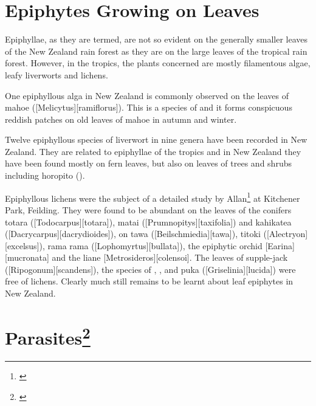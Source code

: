 \section{Epiphytes Growing on Leaves}

Epiphyllae, as they are termed, are not so evident on the generally smaller leaves of the New Zealand rain forest as they are on the large leaves of the tropical rain forest.
However, in the tropics, the plants concerned are mostly filamentous algae, leafy liverworts and lichens.

One epiphyllous alga in New Zealand is commonly observed on the leaves of mahoe ([Melicytus][ramiflorus]).
This is a species of  and it forms conspicuous reddish patches on old leaves of mahoe in autumn and winter.

Twelve epiphyllous species of liverwort in nine genera have been recorded in New Zealand.
They are related to epiphyllae of the tropics and in New Zealand they have been found mostly on fern leaves, but also on leaves of trees and shrubs including horopito ().

Epiphyllous lichens were the subject of a detailed study by Allan\footnote{\cite{zahlbruckner1928epiphyllous}} at Kitchener Park, Feilding.
They were found to be abundant on the leaves of the conifers totara ([Todocarpus][totara]), matai ([Prumnopitys][taxifolia]) and kahikatea ([Dacrycarpus][dacrydioides]), on tawa ([Beilschmiedia][tawa]), titoki ([Alectryon][excelsus]), rama rama ([Lophomyrtus][bullata]), the epiphytic orchid [Earina][mucronata] and the liane [Metrosideros][colensoi].
The leaves of supple-jack ([Ripogonum][scandens]), the species of , ,  and puka ([Griselinia][lucida]) were free of lichens.
Clearly much still remains to be learnt about leaf epiphytes in New Zealand.

\section[Parasites]{Parasites\footnote{\cite{fineran1974parasitic}}}

